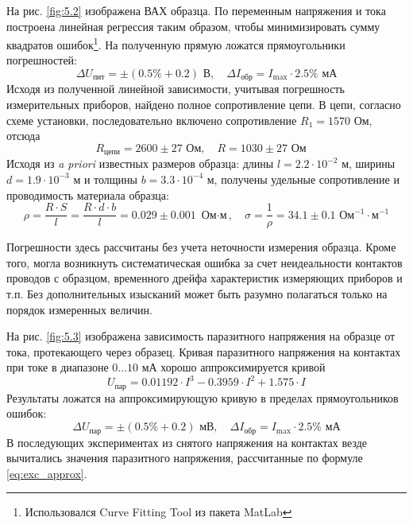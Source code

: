 \documentclass[a4paper,14pt]{extarticle}
\begin{document}
На рис. \ref{fig:5.2} изображена ВАХ образца. По переменным напряжения и тока построена линейная регрессия таким образом, чтобы минимизировать сумму квадратов ошибок\footnote{Использовался Curve Fitting Tool из пакета MatLab}. На полученную прямую ложатся прямоугольники погрешностей:
\begin{equation}
	\Delta U_\text{пит} = \pm (0.5\%+0.2) \text{ В}, \quad
	\Delta I_\text{обр} = I_{\max}\cdot 2.5\% \text{ мА}
\end{equation}
Исходя из полученной линейной зависимости, учитывая погрешность измерительных приборов, найдено полное сопротивление цепи. В цепи, согласно схеме установки, последовательно включено сопротивление $R_1=1570$ Ом, отсюда
\begin{equation}
	R_\text{цепи}=2600\pm27 \text{ Ом}, \quad
	R=1030\pm27 \text{ Ом} \quad
\end{equation}
Исходя из \textit{a priori} известных размеров образца: длины $l=2.2\cdot 10^{-2}$ м, ширины  $d=1.9\cdot 10^{-3}$ м и толщины $b=3.3\cdot 10^{-4} $ м, получены удельные сопротивление и проводимость материала образца:
\begin{equation}
	\rho=\frac{R\cdot S}{l}=\frac{R\cdot d \cdot b}{l}=
	0.029\pm 0.001 \text{ Ом$\cdot$м}, \quad
%
	\sigma=\frac{1}{\rho}=34.1\pm0.1 \text{ Ом$^{-1}\cdot$м$^{-1}$}
\end{equation}

Погрешности здесь рассчитаны без учета неточности измерения образца. 
Кроме того, могла возникнуть систематическая ошибка за счет 
неидеальности контактов проводов с образцом, временного дрейфа 
характеристик измеряющих приборов и т.п. Без дополнительных
изысканий может быть разумно полагаться только на порядок измеренных величин.  


На рис. \ref{fig:5.3} изображена зависимость паразитного напряжения на образце от тока, протекающего через образец. Кривая паразитного напряжения на контактах при токе в диапазоне $0\ldots10$ мА хорошо аппроксимируется кривой
\begin{equation}
	\label{eq:exc_approx}
	U_\text{пар}=0.01192\cdot I^3 - 0.3959\cdot I^2 + 1.575\cdot I
\end{equation}
Результаты ложатся на аппроксимирующую кривую в пределах прямоугольников ошибок:
\begin{equation}
	\Delta U_\text{пар} = \pm (0.5\%+0.2) \text{ мВ}, \quad
	\Delta I_\text{обр} = I_{\max}\cdot 2.5\% \text{ мА}
\end{equation}
В последующих экспериментах из снятого напряжения на контактах везде вычитались значения паразитного напряжения, рассчитанные по формуле \eqref{eq:exc_approx}.
\end{document}
